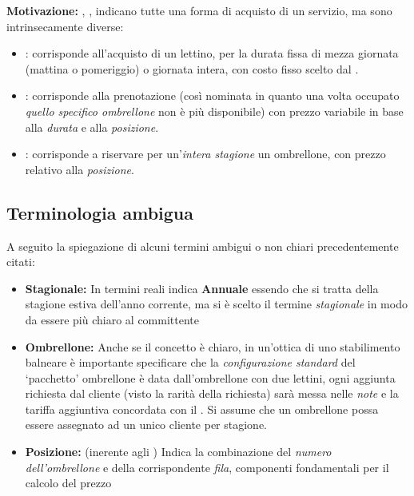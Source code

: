 \textbf{Motivazione:} , ,  indicano tutte una
forma di acquisto di un servizio, ma sono intrinsecamente diverse:
\begin{itemize}
    \item {}: corrisponde all'acquisto di un lettino, per la durata fissa di mezza giornata 
    (mattina o pomeriggio) o giornata intera, con costo fisso scelto dal .
    \item {}: corrisponde alla prenotazione (cos\`{i} nominata in quanto una volta occupato
    \textit{quello specifico ombrellone} non è più disponibile) con prezzo variabile in base alla \textit{durata}
    e alla \textit{posizione}.
    \item {}: corrisponde a riservare per un'\textit{intera stagione} un ombrellone,
    con prezzo relativo alla \textit{posizione}.
\end{itemize}

\subsection{Terminologia ambigua} %

A seguito la spiegazione di alcuni termini ambigui o non chiari precedentemente citati:
\begin{itemize}
    \item \textbf{Stagionale:} In termini reali indica \textbf{Annuale} essendo che si tratta della stagione 
    estiva dell'anno corrente, ma si è scelto il termine \textit{stagionale} in modo da essere più chiaro
    al committente
    \item \textbf{Ombrellone:} Anche se il concetto è chiaro, in un'ottica di uno stabilimento balneare
    è importante specificare che la \textit{configurazione standard} del `pacchetto' ombrellone è data 
    dall'ombrellone con due lettini, ogni aggiunta richiesta dal cliente (visto la rarità della richiesta)
    sarà messa nelle \textit{note} e la tariffa aggiuntiva concordata con il .
    Si assume che un ombrellone possa essere assegnato ad un unico cliente per stagione.
    \item \textbf{Posizione:} (inerente agli ) Indica la combinazione del \textit{numero dell'ombrellone}
    e della corrispondente \textit{fila}, componenti fondamentali per il calcolo del prezzo 
\end{itemize}

